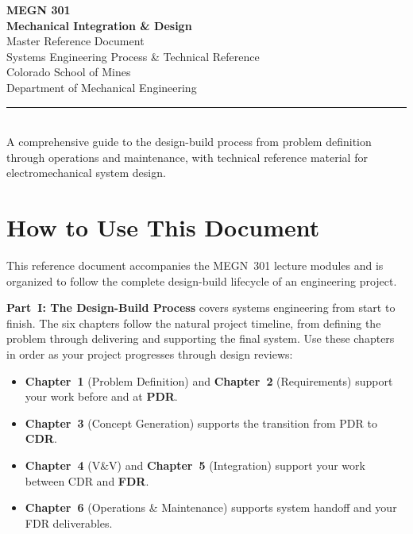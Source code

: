 \documentclass[11pt,letterpaper,twoside,openany]{book}
\begin{document}
\begin{titlepage}
\begin{center}
\vspace*{2cm}
{\Huge\bfseries\sffamily\textcolor{MinesBlue}{MEGN 301}}\\[0.5cm]
{\Huge\bfseries\sffamily\textcolor{MinesBlue}{Mechanical Integration \& Design}}\\[2cm]
{\huge\sffamily\textcolor{MinesBlue}{Master Reference Document}}\\[1cm]
{\Large\sffamily Systems Engineering Process \& Technical Reference}\\[3cm]
{\large\sffamily\textcolor{MinesSilver}{Colorado School of Mines}}\\[0.3cm]
{\large\sffamily\textcolor{MinesSilver}{Department of Mechanical Engineering}}\\[2cm]
\textcolor{MinesBlue}{\rule{0.6\textwidth}{1pt}}\\[0.5cm]
{\normalsize\sffamily A comprehensive guide to the design-build process from problem definition through operations and maintenance, with technical reference material for electromechanical system design.}
\end{center}
\end{titlepage}

\frontmatter
\tableofcontents
\newpage

\chapter*{How to Use This Document}

This reference document accompanies the MEGN~301 lecture modules and is organized to follow the complete design-build lifecycle of an engineering project.

\textbf{Part~I: The Design-Build Process} covers systems engineering from start to finish. The six chapters follow the natural project timeline, from defining the problem through delivering and supporting the final system. Use these chapters in order as your project progresses through design reviews:

\begin{itemize}[nosep,leftmargin=1.5em]
\item \textbf{Chapter~1} (Problem Definition) and \textbf{Chapter~2} (Requirements) support your work before and at \textbf{PDR}.
\item \textbf{Chapter~3} (Concept Generation) supports the transition from PDR to \textbf{CDR}.
\item \textbf{Chapter~4} (V\&V) and \textbf{Chapter~5} (Integration) support your work between CDR and \textbf{FDR}.
\item \textbf{Chapter~6} (Operations \& Maintenance) supports system handoff and your FDR deliverables.
\end{itemize}
\end{document}
